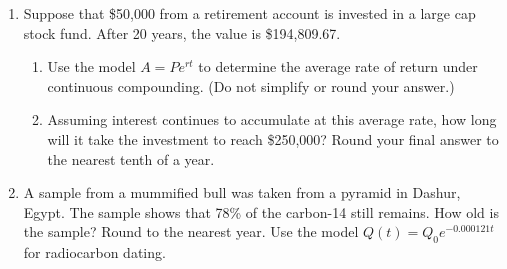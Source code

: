 


\begin{enumerate}
\item Suppose that \$50,000 from a retirement account is invested in a large cap stock fund.  After 20 years, the value is \$194,809.67.
\begin{enumerate}
\item Use the model $A=Pe^{rt}$ to determine the average rate of return under continuous compounding. (Do not simplify or round your answer.)
\vfill
\item  Assuming interest continues to accumulate at this average rate, how long will it take the investment to reach \$250,000?  Round your final answer to the nearest tenth of a year.
\vfill


\end{enumerate}

\clearpage

\item  A sample from a mummified bull was taken from a pyramid in Dashur, Egypt.  The sample shows that 78\% of the carbon-14 still remains.  How old is the sample?  Round to the nearest year.  Use the model $Q(t)=Q_0e^{-0.000121t}$ for radiocarbon dating.



\end{enumerate}



